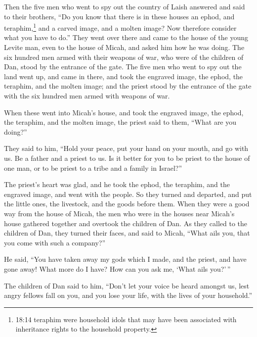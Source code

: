 Then the five men who went to spy out the country of Laish
answered and said to their brothers, ``Do you know that there is in
these houses an ephod, and teraphim,\footnote{18:14 teraphim were
  household idols that may have been associated with inheritance rights
  to the household property.} and a carved image, and a molten image?
Now therefore consider what you have to do.''  They went
over there and came to the house of the young Levite man, even to the
house of Micah, and asked him how he was doing.  The six
hundred men armed with their weapons of war, who were of the children of
Dan, stood by the entrance of the gate.  The five men who
went to spy out the land went up, and came in there, and took the
engraved image, the ephod, the teraphim, and the molten image; and the
priest stood by the entrance of the gate with the six hundred men armed
with weapons of war.

 When these went into Micah's house, and took the engraved
image, the ephod, the teraphim, and the molten image, the priest said to
them, ``What are you doing?''

 They said to him, ``Hold your peace, put your hand on your
mouth, and go with us. Be a father and a priest to us. Is it better for
you to be priest to the house of one man, or to be priest to a tribe and
a family in Israel?''

 The priest's heart was glad, and he took the ephod, the
teraphim, and the engraved image, and went with the people.
 So they turned and departed, and put the little ones, the
livestock, and the goods before them.  When they were a
good way from the house of Micah, the men who were in the houses near
Micah's house gathered together and overtook the children of Dan.
 As they called to the children of Dan, they turned their
faces, and said to Micah, ``What ails you, that you come with such a
company?''

 He said, ``You have taken away my gods which I made, and
the priest, and have gone away! What more do I have? How can you ask me,
`What ails you?'\,''

 The children of Dan said to him, ``Don't let your voice be
heard amongst us, lest angry fellows fall on you, and you lose your
life, with the lives of your household.''

